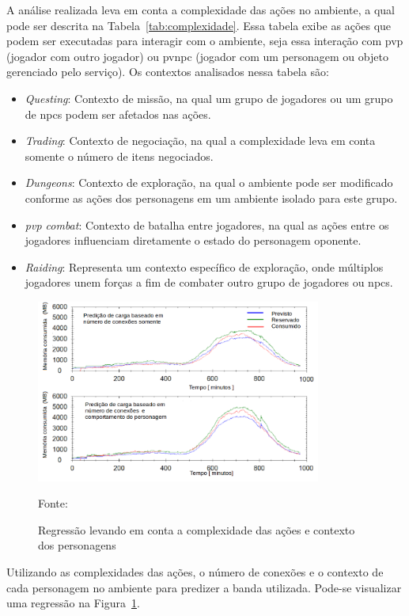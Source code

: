 A análise realizada leva em conta a complexidade das ações no ambiente, a qual pode ser descrita na Tabela~\ref{tab:complexidade}.
%
Essa tabela exibe as ações que podem ser executadas para interagir com o ambiente, seja essa interação com \ac{pvp} (jogador com outro jogador) ou \ac{pvnpc} (jogador com um personagem ou objeto gerenciado pelo serviço).
%
Os contextos analisados nessa tabela são:

\begin{itemize}
  \item \textit{Questing}: Contexto de missão, na qual um grupo de jogadores ou um grupo de \ac{npcs} podem ser afetados nas ações.
  \item \textit{Trading}: Contexto de negociação, na qual a complexidade leva em conta somente o número de itens negociados.
  \item \textit{Dungeons}: Contexto de exploração, na qual o ambiente pode ser modificado conforme as ações dos personagens em um ambiente isolado para este grupo.
  \item \textit{\ac{pvp} combat}: Contexto de batalha entre jogadores, na qual as ações entre os jogadores influenciam diretamente o estado do personagem oponente.
  \item \textit{Raiding}: Representa um contexto específico de exploração, onde múltiplos jogadores unem forças a fim de combater outro grupo de jogadores ou \ac{npcs}.
\end{itemize}


\begin{figure}[htb!]
\caption{Regressão levando em conta a complexidade das ações e contexto dos personagens}
\label{fig:regressao_complexidade}
\includegraphics[height=6.0cm]{img/cap2/network_regressao_complexidade.png}
\centering

Fonte:~\cite{6374456}
\end{figure}


Utilizando as complexidades das ações, o número de conexões e o contexto de cada personagem no ambiente para predizer a banda utilizada.
%
Pode-se visualizar uma regressão na Figura~\ref{fig:regressao_complexidade}.



